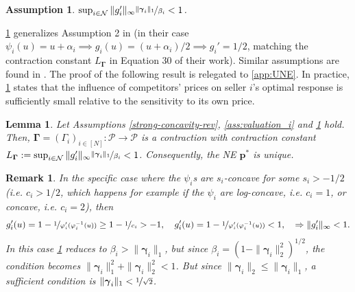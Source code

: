 \documentclass{article} %
\newtheorem{assumption}[theorem]{Assumption}
\newtheorem{lemma}[theorem]{Lemma}
\newtheorem{remark}[theorem]{Remark}
\begin{document}
\begin{assumption}\label{ass:exist_uniq_NE}
$\sup_{i \in \mathcal{N}}\|g_i'\|_{\infty}\nicefrac{\|\boldsymbol{\gamma}_i\|_1}{\beta_i} <1$.
\end{assumption}
\cref{ass:exist_uniq_NE} generalizes Assumption 2 in \cite{li2024lego} (in their case $\psi_i(u)=u+\alpha_i \implies g_i(u)= (u+\alpha_i)/2 \implies g_i' = 1/2$, matching the contraction constant $L_{\boldsymbol{\Gamma}}$ in Equation 30 of their work). Similar assumptions are found in \cite{kachani2007modeling}. The proof of the following result is relegated to \cref{app:UNE}. In practice, \cref{ass:exist_uniq_NE} states that the influence of competitors' prices on seller $i$'s optimal response is sufficiently small relative to the sensitivity to its own price.

\begin{lemma}\label{lemma:contraction} Let Assumptions \ref{strong-concavity-rev}, \ref{ass:valuation_i} and \ref{ass:exist_uniq_NE} hold. Then, $\boldsymbol{\Gamma}=(\Gamma_i)_{i \in [N]}:\mathcal{P}\to \mathcal{P}$ is a contraction with contraction constant $L_{\boldsymbol{\Gamma}}:=\sup_{i \in \mathcal{N}}\|g_i'\|_{\infty}\nicefrac{\|\boldsymbol{\gamma}_i\|_1}{\beta_i}<1$. Consequently, the NE $\mathbf{p}^*$ is unique.
\end{lemma}

\begin{remark}\label{remark:ENE}
In the specific case where the $\psi_i$s are $s_i$-concave for some $s_i>-1/2$ (i.e. $c_i>1/2$, which happens for example if the $\psi_i$ are log-concave, i.e. $c_i=1$, or concave, i.e. $c_i=2$), then
$$
g_i'(u) = 1-\nicefrac{1}{\varphi_i'(\varphi_i^{-1}(u))}\geq 1-\nicefrac{1}{c_i}>-1,\quad 
g_i'(u) = 1-\nicefrac{1}{\varphi_i'(\varphi_i^{-1}(u))}< 1, \quad \Rightarrow \|g_i'\|_{\infty}<1.
$$
In this case \cref{ass:exist_uniq_NE} reduces to $\beta_i>\|\boldsymbol{\gamma}_i\|_1$, but since $\beta_i = (1-\|\boldsymbol{\gamma}_i\|_2^2)^{1/2}$, the condition becomes $\|\boldsymbol{\gamma}_i\|_1^2+\|\boldsymbol{\gamma}_i\|_2^2<1$. But since $\|\boldsymbol{\gamma}_i\|_2 \leq \|\boldsymbol{\gamma}_i\|_1$, a sufficient condition is $\|\boldsymbol{\gamma}_i\|_1<\nicefrac{1}{\sqrt{2}}$. 
\end{remark}
\end{document}
